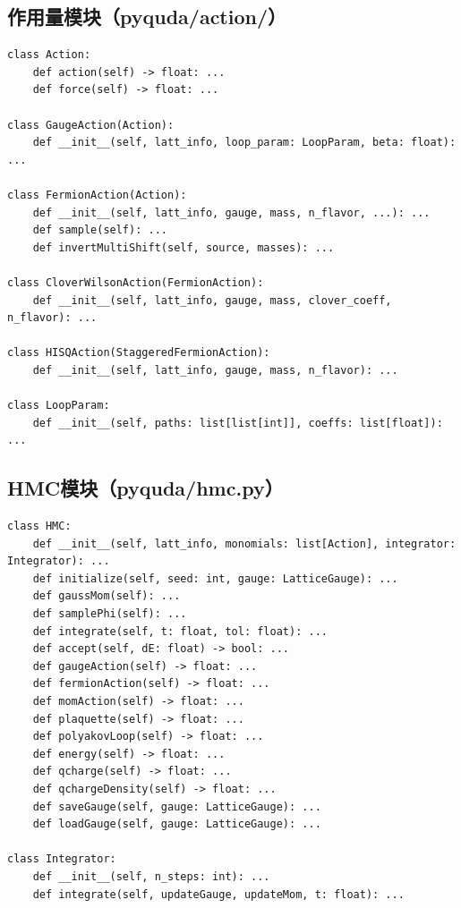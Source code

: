 \documentclass[12pt,a4paper]{ctexart}
\begin{document}
\subsection{作用量模块（pyquda/action/）}

\begin{lstlisting}[caption={作用量接口}]
class Action:
    def action(self) -> float: ...
    def force(self) -> float: ...

class GaugeAction(Action):
    def __init__(self, latt_info, loop_param: LoopParam, beta: float): ...

class FermionAction(Action):
    def __init__(self, latt_info, gauge, mass, n_flavor, ...): ...
    def sample(self): ...
    def invertMultiShift(self, source, masses): ...

class CloverWilsonAction(FermionAction):
    def __init__(self, latt_info, gauge, mass, clover_coeff, n_flavor): ...

class HISQAction(StaggeredFermionAction):
    def __init__(self, latt_info, gauge, mass, n_flavor): ...

class LoopParam:
    def __init__(self, paths: list[list[int]], coeffs: list[float]): ...
\end{lstlisting}

\subsection{HMC模块（pyquda/hmc.py）}

\begin{lstlisting}[caption={HMC接口}]
class HMC:
    def __init__(self, latt_info, monomials: list[Action], integrator: Integrator): ...
    def initialize(self, seed: int, gauge: LatticeGauge): ...
    def gaussMom(self): ...
    def samplePhi(self): ...
    def integrate(self, t: float, tol: float): ...
    def accept(self, dE: float) -> bool: ...
    def gaugeAction(self) -> float: ...
    def fermionAction(self) -> float: ...
    def momAction(self) -> float: ...
    def plaquette(self) -> float: ...
    def polyakovLoop(self) -> float: ...
    def energy(self) -> float: ...
    def qcharge(self) -> float: ...
    def qchargeDensity(self) -> float: ...
    def saveGauge(self, gauge: LatticeGauge): ...
    def loadGauge(self, gauge: LatticeGauge): ...

class Integrator:
    def __init__(self, n_steps: int): ...
    def integrate(self, updateGauge, updateMom, t: float): ...
\end{lstlisting}
\end{document}
